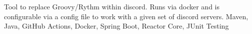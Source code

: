 {Tool to replace Groovy/Rythm within discord. Runs via docker and is configurable via a config file to work with a given set of discord servers.}
{Maven, Java, GitHub Actions, Docker, Spring Boot, Reactor Core, JUnit Testing}